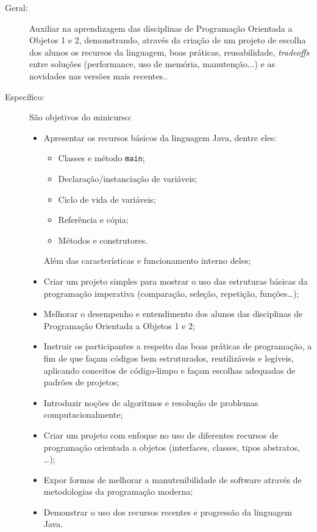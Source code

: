 \documentclass{article}
\begin{document}
\begin{description}
    \item[Geral:] Auxiliar na aprendizagem das disciplinas de Programação Orientada a Objetos 1 e 2, demonstrando, através da criação de um projeto de escolha dos alunos os recursos da linguagem, boas práticas, reusabilidade, \textit{tradeoffs} entre soluções (performance, uso de memória, manutenção...) e as novidades nas versões mais recentes..
    \item[Específico:] São objetivos do minicurso:
        \begin{itemize}[label={-}]
                \item Apresentar os recursos básicos da linguagem Java, dentre eles:
\begin{itemize}[label={-}]    \item Classes e método \texttt{main};
    \item Declaração/instanciação de variáveis;
    \item Ciclo de vida de variáveis;
    \item Referência e cópia;
    \item Métodos e construtores.
\end{itemize}Além das características e funcionamento interno deles;
                \item Criar um projeto simples para mostrar o uso das  estruturas básicas da programação imperativa  (comparação, seleção, repetição, funções\ldots);
                \item Melhorar o desempenho e entendimento dos alunos das  disciplinas de Programação Orientada a Objetos 1 e 2;
                \item Instruir os participantes a respeito das boas práticas de programação, a fim de que façam códigos bem  estruturados, reutilizáveis e legíveis, aplicando  conceitos de código-limpo e façam escolhas adequadas de  padrões de projetos;
                \item Introduzir noções de algoritmos e resolução de problemas computacionalmente;
                \item Criar um projeto com enfoque no uso de diferentes recursos de programação orientada a objetos (interfaces, classes, tipos abstratos, \ldots);
                \item Expor formas de melhorar a manutenibilidade de software através de metodologias da programação moderna;
                \item Demonstrar o uso dos recursos recentes e progressão da linguagem Java.
        \end{itemize}
\end{description}
\end{document}
